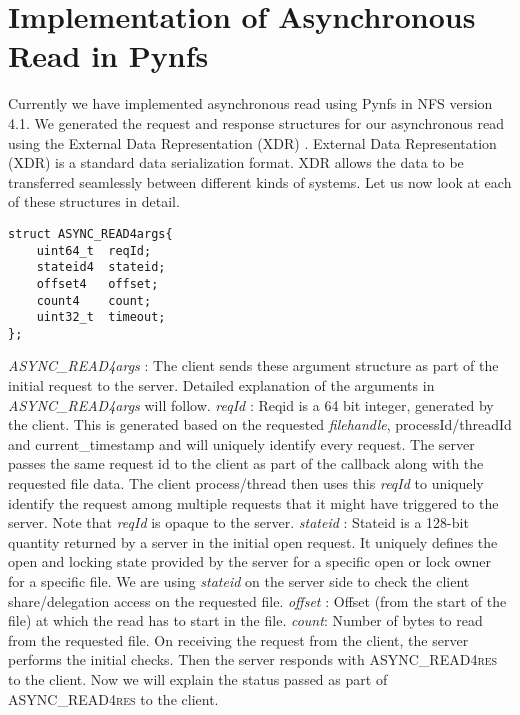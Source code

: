 \section{Implementation of Asynchronous Read in Pynfs}

Currently we have implemented asynchronous read using Pynfs in NFS version 4.1. We generated the request and response structures for our asynchronous read using the External Data Representation (XDR) \cite{XDR}. External Data Representation (XDR) is a standard data serialization format. XDR allows the data to be transferred seamlessly between different kinds of systems. Let us now look at each of these structures in detail.

\begin{lstlisting}
struct ASYNC_READ4args{
	uint64_t  reqId; 
	stateid4  stateid; 
	offset4	  offset; 
	count4	  count;
	uint32_t  timeout; 
};
\end{lstlisting}

\noindent\textit{ASYNC\_READ4args} : The client sends these argument structure as part of the initial request to the server. Detailed explanation of the arguments in \textit{ASYNC\_READ4args} will follow. 
\hfill \break \newline
\noindent\textit{reqId} : Reqid is a 64 bit integer, generated by the client. This is generated based on the requested \textit{filehandle}, processId/threadId and current\_timestamp and will uniquely identify every request. The server passes the same request id to the client as part of the callback along with the requested file data. The client process/thread then uses this  \textit{reqId} to uniquely identify the request among multiple requests that it might have triggered to the server. Note that \textit{reqId} is opaque to the server.
\hfill \break \newline
\noindent\textit{stateid} : Stateid is a 128-bit quantity returned by a server in the initial open request. It uniquely defines the open and locking state provided by the server for a specific open or lock owner for a specific file. We are using \textit{stateid} on the server side to check the client share/delegation access on the requested file. 
\hfill \break \newline
\noindent\textit{offset} : Offset (from the start of the file) at which the read has to start in the file. 
\hfill \break \newline
\noindent\textit{count}: Number of bytes to read from the requested file.
\hfill \break \newline
\noindent On receiving the request from the client, the server performs the initial checks. Then the server responds with \textsc{ASYNC\_READ4res} to the client. Now we will explain the status passed as part of \textsc{ASYNC\_READ4res} to the client.  

